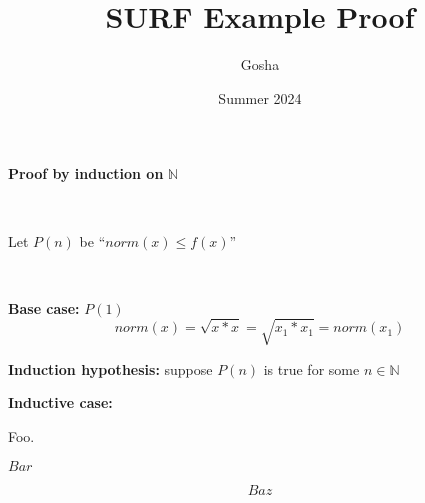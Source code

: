 \documentclass{article}
\title{SURF Example Proof}
\author{Gosha}
\date{Summer 2024}
\begin{document}
\maketitle

\textbf {Proof by induction on} $\mathbb N$

\

Let $P(n)$ be ``$norm(x) \leq f(x)$''

\

\textbf {Base case:} $P(1)$
$$norm(x) = \sqrt {x * x} = \sqrt {x_1 * x_1} = norm(x_1)$$

\textbf {Induction hypothesis:} suppose $P(n)$ is true for some $n \in \mathbb N$

\textbf {Inductive case:}

Foo.

$Bar$

$$Baz$$
\end{document}
